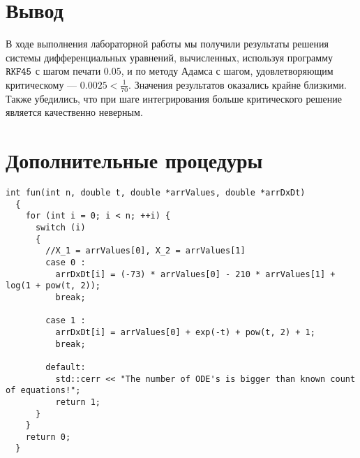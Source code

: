 \documentclass[a4paper,11pt]{article}
\begin{document}
\section{Вывод}
В ходе выполнения лабораторной работы мы получили результаты решения системы дифференциальных уравнений, вычисленных, используя программу $\verb|RKF45|$ с шагом печати $0.05$, и по методу Адамса с шагом, удовлетворяющим критическому --- $0.0025 < \frac{1}{70}$. Значения результатов оказались крайне близкими. Также убедились, что при шаге интегрирования больше критического решение является качественно неверным.

\section{Дополнительные процедуры}
\begin{lstlisting}[label=fun, caption=Function]
  int fun(int n, double t, double *arrValues, double *arrDxDt)
  {
    for (int i = 0; i < n; ++i) {
      switch (i)
      {
        //X_1 = arrValues[0], X_2 = arrValues[1]
        case 0 :
          arrDxDt[i] = (-73) * arrValues[0] - 210 * arrValues[1] + log(1 + pow(t, 2));
          break;

        case 1 :
          arrDxDt[i] = arrValues[0] + exp(-t) + pow(t, 2) + 1;
          break;

        default:
          std::cerr << "The number of ODE's is bigger than known count of equations!";
          return 1;
      }
    }
    return 0;
  }
\end{lstlisting}
\end{document}
